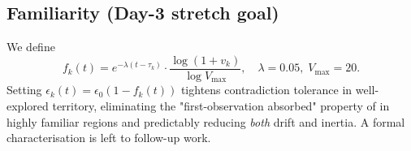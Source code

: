 \subsection{Familiarity (Day-3 stretch goal)}
We define
\[
f_k(t) = e^{-\lambda(t-\tau_k)}\cdot\frac{\log(1+v_k)}{\log V_{\max}},
\quad\lambda=0.05,\;V_{\max}=20.
\]
Setting $\epsilon_k(t) = \epsilon_0 (1-f_k(t))$ tightens
contradiction tolerance in well-explored territory, eliminating the
"first-observation absorbed" property of \tb in highly familiar
regions and predictably reducing \emph{both} drift and inertia.
A formal characterisation is left to follow-up work.
